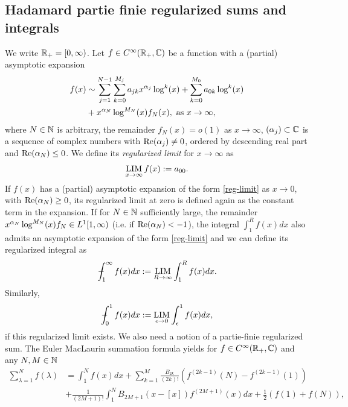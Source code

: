 \subsection{Hadamard partie finie regularized sums and integrals} 
We write $\mathbb{R}_+=[0,\infty)$.
Let $f\in C^{\infty}(\mathbb{R}_+,\mathbb{C})$ be a function with a (partial) asymptotic expansion 
\begin{equation}
\label{reg-limit}
\begin{split}
f(x) &\sim \sum_{j=1}^{N-1} \sum_{k=0}^{M_j} a_{jk}x^{\mathrm{\alpha}_j} \log^k(x) +
\sum_{k=0}^{M_0} a_{0k} \log^k(x) \\ 
&+ x^{\mathrm{\alpha}_N}\log^{M_N}(x) f_N(x), \ \textup{as} \ x\to \infty,
\end{split}
\end{equation}
where $N\in \mathbb{N}$ is arbitrary, the remainder $f_N(x)=o(1)$ as $x\to \infty$, 
$(\mathrm{\alpha}_j)\subset \mathbb{C}$ is a sequence of complex numbers with $\textup{Re}(\mathrm{\alpha}_j)\neq 0$, 
ordered by descending real part and $\textup{Re}(\mathrm{\alpha}_N) \leq 0$. 
We define its \emph{regularized limit} for $x\to \infty$ as 
\begin{align}
\operatorname*{LIM}_{x\to \infty}f(x) :=a_{00}.
\end{align}
If $f(x)$ has a (partial) asymptotic expansion of the form \eqref{reg-limit} as $x\to 0$, 
with $\textup{Re}(\mathrm{\alpha}_N) \geq 0$, its regularized limit at zero is defined again as the 
constant term in the expansion. If for $N\in \mathbb{N}$ sufficiently large, the remainder 
$x^{\mathrm{\alpha}_N} \log^{M_N}(x) f_N\in L^1[1,\infty)$ (i.e. if $\textup{Re}(\mathrm{\alpha}_N) <-1$), the integral $\int_1^R f(x)dx$ also admits an asymptotic 
expansion of the form \eqref{reg-limit} and we can define its regularized integral 
as 
\begin{align}
-\hspace*{-1em}\int_1^\infty f(x)dx := \operatorname*{LIM}_{R\to \infty}\int_1^R f(x) dx.
\end{align}
Similarly, 
\begin{align}
-\hspace*{-1em}\int_0^1 f(x)dx := \operatorname*{LIM}_{\epsilon\to 0}\int_\epsilon^1 f(x) dx,
\end{align}
if this regularized limit exists. We also need a notion 
of a partie-finie regularized sum. The Euler MacLaurin summation formula 
yields for $f\in C^{\infty}(\mathbb{R}_+,\mathbb{C})$ and any $N,M\in \mathbb{N}$
\begin{equation}
\label{EM}
\begin{split}
\sum_{\lambda=1}^{N} f(\lambda) &= \int_1^N f(x)dx +\sum_{k=1}^M \frac{B_{2k}}{(2k)!} 
\left(f^{(2k-1)}(N)-f^{(2k-1)}(1)\right) \\ &+ \frac{1}{(2M+1)!} \int_1^N 
B_{2M+1}(x-[x])f^{(2M+1)}(x)dx  +\frac{1}{2}(f(1) + f(N)),
\end{split}
\end{equation}
